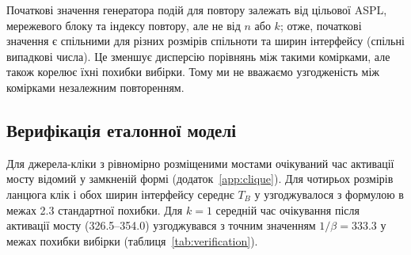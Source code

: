 Початкові значення генератора подій для повтору залежать від цільової ASPL, мережевого блоку та індексу повтору, але не від $n$ або $k$; отже, початкові значення є спільними для різних розмірів спільноти та ширин інтерфейсу (спільні випадкові числа). Це зменшує дисперсію порівнянь між такими комірками, але також корелює їхні похибки вибірки. Тому ми не вважаємо узгодженість між комірками незалежним повторенням.

\subsection{Верифікація еталонної моделі}
\enlargethispage{2\baselineskip}

Для джерела-кліки з рівномірно розміщеними мостами очікуваний час активації мосту відомий у замкненій формі (додаток~\ref{app:clique}). Для чотирьох розмірів ланцюга клік і обох ширин інтерфейсу середнє $T_B$ у \Full{} узгоджувалося з формулою в межах 2.3 стандартної похибки. Для $k=1$ середній час очікування після активації мосту (326.5--354.0) узгоджувався з точним значенням $1/\beta=333.3$ у межах похибки вибірки (таблиця~\ref{tab:verification}).

